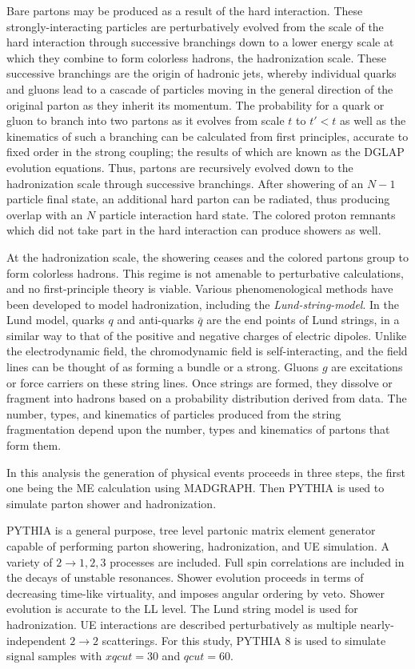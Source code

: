 Bare partons may be produced as a result of the hard interaction. These strongly-interacting particles are perturbatively evolved from the scale of the hard interaction through successive branchings down to a lower energy scale at which they combine to form colorless hadrons, the hadronization scale. These successive branchings are the origin of hadronic jets, whereby individual quarks and gluons lead to a cascade of particles moving in the general direction of the original parton as they inherit its momentum. The probability for a quark or gluon to branch into two partons as it evolves from scale $t$ to $t'<t$ as well as the kinematics of such a branching can be calculated from first principles, accurate to fixed order in the strong coupling; the results of which are known as the DGLAP evolution equations\cite{Altarelli:1977zs}. Thus, partons are recursively evolved down to the hadronization scale through successive branchings. After showering of an $N-1$ particle final state, an additional hard parton can be radiated, thus producing overlap with an $N$ particle interaction hard state. The colored proton remnants which did not take part in the hard interaction can produce showers as well. 

At the hadronization scale, the showering ceases and the colored partons group to form colorless hadrons. This regime is not amenable to perturbative calculations, and no first-principle theory is viable. Various phenomenological methods have been developed to model hadronization, including the \textit{Lund-string-model}\cite{ANDERSSON198331}. In the Lund model, quarks $q$ and anti-quarks $\bar{q}$ are the end points of Lund strings, in a similar way to that of the positive and negative charges of electric dipoles. Unlike the electrodynamic field, the chromodynamic field is self-interacting, and the field lines can be thought of as forming a bundle or a strong. Gluons $g$ are excitations or force carriers on these string lines. Once strings are formed, they dissolve or fragment into hadrons based on a probability distribution derived from data. The number, types, and kinematics of particles produced from the string fragmentation depend upon the number, types and kinematics of partons that form them. 

In this analysis the generation of physical events proceeds in three steps, the first one being the ME calculation using MADGRAPH. Then PYTHIA is used to simulate parton shower and hadronization.

PYTHIA\cite{Sjostrand:2014zea} is a general purpose, tree level partonic matrix element generator capable of performing parton showering, hadronization, and UE simulation. A variety of $2\rightarrow1,2,3$ processes are included. Full spin correlations are included in the decays of unstable resonances. Shower evolution proceeds in terms of decreasing time-like virtuality, and imposes angular ordering by veto. Shower evolution is accurate to the LL level. The Lund string model is used for hadronization. UE interactions are described perturbatively as multiple nearly-independent $2\rightarrow 2$ scatterings. For this study, PYTHIA 8 is used to simulate signal samples with $xqcut=30$ and $qcut=60$.

